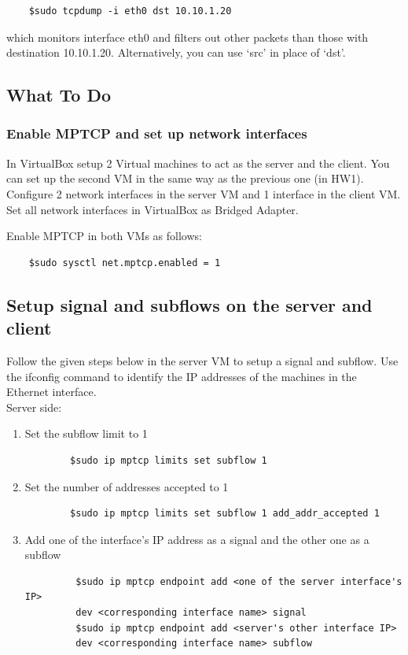 \documentclass[11pt]{article}
\begin{document}
\begin{verbatim}
    $sudo tcpdump -i eth0 dst 10.10.1.20
\end{verbatim}
which monitors interface eth0 and filters out other packets than those with destination 10.10.1.20. Alternatively, you can use `src' in place of `dst'.

\subsection{What To Do}

\subsubsection{Enable MPTCP and set up network interfaces}
In VirtualBox setup 2 Virtual machines to act as the server and the client. You can set up the second VM in the same way as the previous one (in HW1). Configure 2 network interfaces in the server VM and 1 interface in the client VM. Set all network interfaces in VirtualBox as Bridged Adapter. 

Enable MPTCP in both VMs as follows:
\begin{verbatim}
    $sudo sysctl net.mptcp.enabled = 1
\end{verbatim}

\subsection{Setup signal and subflows on the server and client}
Follow the given steps below in the server VM to setup a signal and subflow. Use the ifconfig command to identify the IP addresses of the machines in the Ethernet interface. \\

Server side:
\vspace{-10pt}
\begin{enumerate}
    \item Set the subflow limit to 1
    \vspace{-10pt}
    \begin{verbatim}
        $sudo ip mptcp limits set subflow 1
    \end{verbatim}
    \vspace{-10pt}
    \item Set the number of addresses accepted to 1
    \vspace{-10pt}
    \begin{verbatim}
        $sudo ip mptcp limits set subflow 1 add_addr_accepted 1
    \end{verbatim}
    \vspace{-10pt}
    \item Add one of the interface's IP address as a signal and the other one as a subflow
    \vspace{-10pt}
    \begin{verbatim}
         $sudo ip mptcp endpoint add <one of the server interface's IP> 
         dev <corresponding interface name> signal
         $sudo ip mptcp endpoint add <server's other interface IP> 
         dev <corresponding interface name> subflow
    \end{verbatim}
\end{enumerate}
\end{document}
